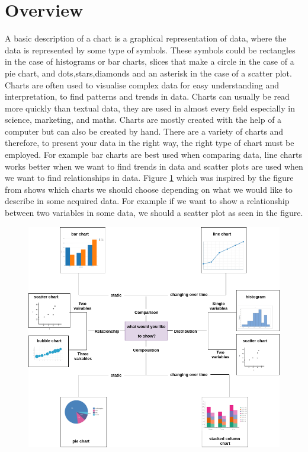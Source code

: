 \documentclass[12pt, a4paper,oneside]{report}
\begin{document}
\section{Overview} 
A basic description of a chart is a graphical representation of data, where the data is represented by some type of symbols. These symbols could be rectangles in the case of histograms or bar charts,  slices that make a circle in the case of a pie chart, and dots,stars,diamonds and an asterisk in the case of a scatter plot.
Charts are often used to visualise complex data for easy understanding and interpretation, to find patterns and trends in data. Charts can usually be read more quickly than textual data, they are used in almost every field especially in science, marketing, and maths. Charts are mostly created with the help of a computer but can also be created by hand. There are a variety of charts and therefore, to present your data in the right way, the right type of chart must be employed. For example bar charts are best used when comparing data, line charts works better when we want to find trends in data and scatter plots are used when we want to find relationships in data. Figure \ref{fig:chartse} which was inspired by the figure from \cite{chartselection} shows which charts we should choose depending on what we would like to describe in some acquired data. For example if we want to show a relationship between two variables in some data, we should a scatter plot as seen in the figure.\\

\begin{figure}[!htb]
	\centering
	\includegraphics [scale=0.5] {chart}
	\label{fig:chartse}
\end{figure}
\end{document}
